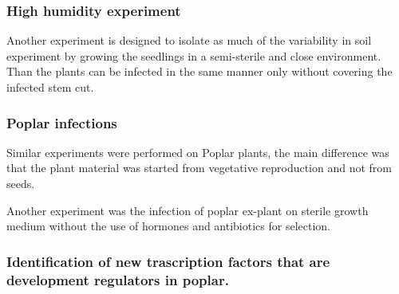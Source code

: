 \documentclass[
]{article}
\begin{document}
\hypertarget{high-humidity-experiment}{%
\subsubsection{High humidity
experiment}\label{high-humidity-experiment}}

Another experiment is designed to isolate as much of the variability in
soil experiment by growing the seedlings in a semi-sterile and close
environment. Than the plants can be infected in the same manner only
without covering the infected stem cut.

\hypertarget{poplar-infections}{%
\subsubsection{Poplar infections}\label{poplar-infections}}

Similar experiments were performed on Poplar plants, the main difference
was that the plant material was started from vegetative reproduction and
not from seeds.

Another experiment was the infection of poplar ex-plant on sterile
growth medium without the use of hormones and antibiotics for selection.

\hypertarget{identification-of-new-trascription-factors-that-are-development-regulators-in-poplar.}{%
\subsubsection{Identification of new trascription factors that are
development regulators in
poplar.}\label{identification-of-new-trascription-factors-that-are-development-regulators-in-poplar.}}
\end{document}
